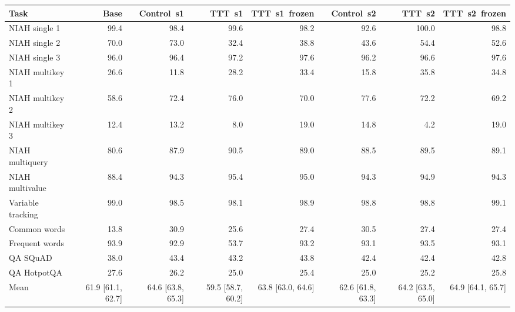 \begin{tabular}{lrrrrrrr}
\toprule
Task & Base & Control~s1 & TTT~s1 & TTT~s1~frozen & Control~s2 & TTT~s2 & TTT~s2~frozen \\
\midrule
NIAH single 1 & 99.4 & 98.4 & 99.6 & 98.2 & 92.6 & 100.0 & 98.8 \\
NIAH single 2 & 70.0 & 73.0 & 32.4 & 38.8 & 43.6 & 54.4 & 52.6 \\
NIAH single 3 & 96.0 & 96.4 & 97.2 & 97.6 & 96.2 & 96.6 & 97.6 \\
NIAH multikey 1 & 26.6 & 11.8 & 28.2 & 33.4 & 15.8 & 35.8 & 34.8 \\
NIAH multikey 2 & 58.6 & 72.4 & 76.0 & 70.0 & 77.6 & 72.2 & 69.2 \\
NIAH multikey 3 & 12.4 & 13.2 & 8.0 & 19.0 & 14.8 & 4.2 & 19.0 \\
NIAH multiquery & 80.6 & 87.9 & 90.5 & 89.0 & 88.5 & 89.5 & 89.1 \\
NIAH multivalue & 88.4 & 94.3 & 95.4 & 95.0 & 94.3 & 94.9 & 94.3 \\
Variable tracking & 99.0 & 98.5 & 98.1 & 98.9 & 98.8 & 98.8 & 99.1 \\
Common words & 13.8 & 30.9 & 25.6 & 27.4 & 30.5 & 27.4 & 27.4 \\
Frequent words & 93.9 & 92.9 & 53.7 & 93.2 & 93.1 & 93.5 & 93.1 \\
QA SQuAD & 38.0 & 43.4 & 43.2 & 43.8 & 42.4 & 42.4 & 42.8 \\
QA HotpotQA & 27.6 & 26.2 & 25.0 & 25.4 & 25.0 & 25.2 & 25.8 \\
\midrule
Mean & 61.9 [61.1, 62.7] & 64.6 [63.8, 65.3] & 59.5 [58.7, 60.2] & 63.8 [63.0, 64.6] & 62.6 [61.8, 63.3] & 64.2 [63.5, 65.0] & 64.9 [64.1, 65.7] \\
\bottomrule
\end{tabular}
